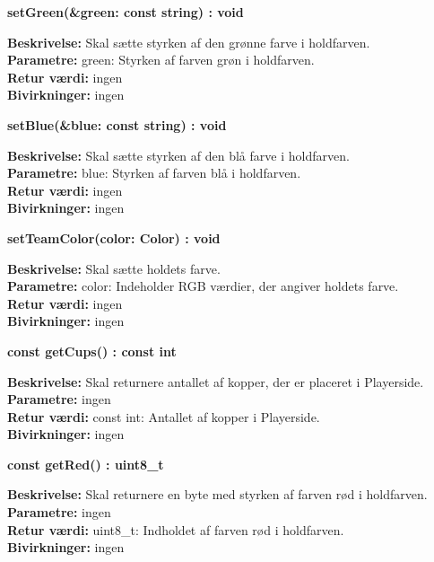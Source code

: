 \documentclass[Arkitektur/System_main.tex]{subfiles}
\begin{document}
\textbf{setGreen(\&green: const string) : void}
\begin{adjustwidth}{1cm}{0pt}
\textbf{Beskrivelse:} Skal sætte styrken af den grønne farve i holdfarven.\\
\textbf{Parametre:} green: Styrken af farven grøn i holdfarven. \\[0.2cm]
\textbf{Retur værdi:} ingen \\[0.2cm]
\textbf{Bivirkninger:} ingen \\[0.2cm]
\end{adjustwidth}

\textbf{setBlue(\&blue: const string) : void}
\begin{adjustwidth}{1cm}{0pt}
\textbf{Beskrivelse:} Skal sætte styrken af den blå farve i holdfarven.\\
\textbf{Parametre:} blue: Styrken af farven blå i holdfarven. \\[0.2cm]
\textbf{Retur værdi:} ingen \\[0.2cm]
\textbf{Bivirkninger:} ingen \\[0.2cm]
\end{adjustwidth}

\textbf{setTeamColor(color: Color) : void}
\begin{adjustwidth}{1cm}{0pt}
\textbf{Beskrivelse:} Skal sætte holdets farve.\\
\textbf{Parametre:} color: Indeholder RGB værdier, der angiver holdets farve. \\[0.2cm]
\textbf{Retur værdi:} ingen \\[0.2cm]
\textbf{Bivirkninger:} ingen \\[0.2cm]
\end{adjustwidth}

\textbf{const getCups() : const int}
\begin{adjustwidth}{1cm}{0pt}
\textbf{Beskrivelse:} Skal returnere antallet af kopper, der er placeret i Playerside.\\
\textbf{Parametre:} ingen \\[0.2cm]
\textbf{Retur værdi:} const int: Antallet af kopper i Playerside.\\[0.2cm]
\textbf{Bivirkninger:} ingen \\[0.2cm]
\end{adjustwidth}

\textbf{const getRed() : uint8\_t}
\begin{adjustwidth}{1cm}{0pt}
\textbf{Beskrivelse:} Skal returnere en byte med styrken af farven rød i holdfarven.\\
\textbf{Parametre:} ingen \\[0.2cm]
\textbf{Retur værdi:} uint8\_t: Indholdet af farven rød i holdfarven.\\[0.2cm]
\textbf{Bivirkninger:} ingen \\[0.2cm]
\end{adjustwidth}
\end{document}
